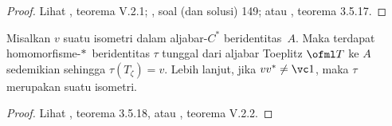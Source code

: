 \begin{proof} Lihat \cite{Davidson:1996}, teorema V.2.1; \cite{Halmos:1982}, soal (dan
solusi) 149; atau \cite{Murphy:1990}, teorema 3.5.17. \ns
\end{proof}

\begin{thm}[Coburn]
Misalkan $v$ suatu isometri dalam aljabar-$C^*$ beridentitas~$A$.
Maka
terdapat
homomorfisme-$*\,$
beridentitas
$\tau$ tunggal dari aljabar Toeplitz $\ofml T$ ke $A$ sedemikian sehingga
$\tau(T_\zeta) = v$. Lebih lanjut, jika $vv^* \ne \vc 1$, maka $\tau$ merupakan suatu isometri.
\end{thm}

\begin{proof} Lihat \cite{Murphy:1990}, teorema 3.5.18, atau \cite{Davidson:1996},
teorema V.2.2. \ns
\end{proof}
%
 
  
 









